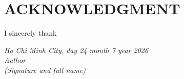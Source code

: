 \chapter*{ACKNOWLEDGMENT}
\qquad I sincerely thank \dotfill

\dotfill

\dotfill

\vspace*{1cm}
\begin{flushright}
	\begin{minipage}{8.75cm}
		\centering\itshape
		Ho Chi Minh City, day 24 month 7 year 2026\\
		Author\\
		(Signature and full name)
	\end{minipage}
\end{flushright}
\newpage